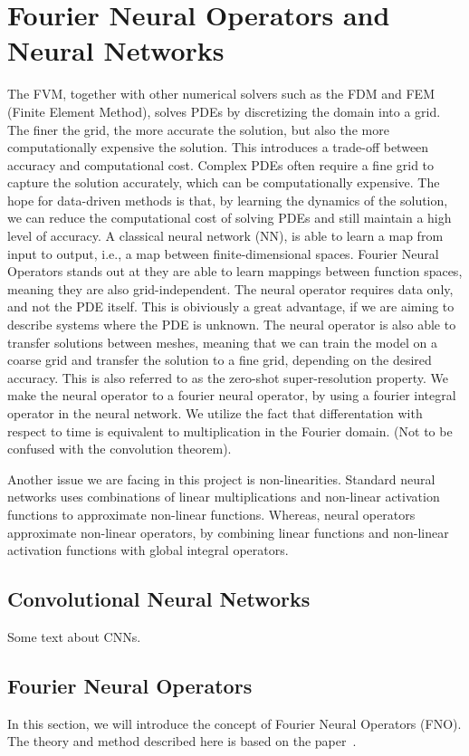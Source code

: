 \section{Fourier Neural Operators and Neural Networks}
The FVM, together with other numerical solvers such as the FDM and FEM (Finite Element Method), solves PDEs by discretizing the domain into a grid.
The finer the grid, the more accurate the solution, but also the more computationally expensive the solution. This introduces a trade-off between accuracy and computational cost.
Complex PDEs often require a fine grid to capture the solution accurately, which can be computationally expensive.
The hope for data-driven methods is that, by learning the dynamics of the solution, we can reduce the computational cost of solving PDEs and still maintain a high level of accuracy.
A classical neural network (NN), is able to learn a map from input to output, i.e., a map between finite-dimensional spaces.
Fourier Neural Operators stands out at they are able to learn mappings between function spaces, meaning they are also grid-independent.
The neural operator requires data only, and not the PDE itself.
This is obiviously a great advantage, if we are aiming to describe systems where the PDE is unknown. 
The neural operator is also able to transfer solutions between meshes, meaning that we can train the model on a coarse grid and transfer the solution to a fine grid, depending on the desired accuracy.
This is also referred to as the zero-shot super-resolution property.
We make the neural operator to a fourier neural operator, by using a fourier integral operator in the neural network.
We utilize the fact that differentation with respect to time is equivalent to multiplication in the Fourier domain.
(Not to be confused with the convolution theorem).

Another issue we are facing in this project is non-linearities.
Standard neural networks uses combinations of linear multiplications and non-linear activation functions to approximate non-linear functions.
Whereas, neural operators approximate non-linear operators, by combining linear functions and non-linear activation functions with global integral operators. 

\subsection{Convolutional Neural Networks}
Some text about CNNs.


\subsection{Fourier Neural Operators}
In this section, we will introduce the concept of Fourier Neural Operators (FNO).
The theory and method described here is based on the paper~\cite{FNO_2021}.

